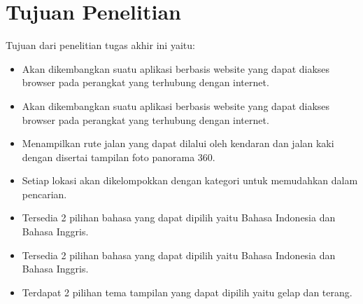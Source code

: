 
		


\section{Tujuan Penelitian}

Tujuan dari penelitian tugas akhir ini yaitu:

\begin{itemize}
	\item Akan dikembangkan suatu aplikasi berbasis website yang dapat diakses browser pada perangkat yang terhubung dengan internet. 
	\item Akan dikembangkan suatu aplikasi berbasis website yang dapat diakses browser pada perangkat yang terhubung dengan internet.
	\item Menampilkan rute jalan yang dapat dilalui oleh kendaran dan jalan kaki dengan disertai tampilan foto panorama 360. 
	\item Setiap lokasi akan dikelompokkan dengan kategori untuk memudahkan dalam pencarian.
	\item Tersedia 2 pilihan bahasa yang dapat dipilih yaitu Bahasa Indonesia dan Bahasa Inggris.
	\item Tersedia 2 pilihan bahasa yang dapat dipilih yaitu Bahasa Indonesia dan Bahasa Inggris.
	\item Terdapat 2 pilihan tema tampilan yang dapat dipilih yaitu gelap dan terang.
\end{itemize}



